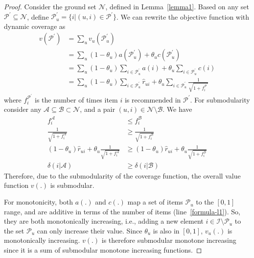 \begin{proof}Consider the ground set $\mathcal{N}$,  defined in Lemma~\ref{lemma1}. Based on any set $\mathcal{P}^{'} \subseteq \mathcal{N}$, define $\mathcal{P}^{'}_{u} = \{ i | (u,i) \in \mathcal{P}^{'}\}$. We can rewrite the objective function with dynamic coverage as 
\begin{align} 
v(\mathcal{P}^{'}) &= \sum_u v_u(\mathcal{P}^{'}_{u})\nonumber \\  
&=  \sum_u  (1-\theta_u) a(\mathcal{P}^{'}_{u})  + \theta_{u} c(\mathcal{P}^{'}_{u}) \nonumber \\
&= \sum_u  (1-\theta_u) \sum_{i \in \mathcal{P}^{'}_{u}} a(i)  + \theta_{u} \sum_{i \in\mathcal{P}^{'}_{u}} c(i) \label{formula-l1} \\
&= \sum_u  (1-\theta_u) \sum_{i \in \mathcal{P}^{'}_{u}} \hat{r}_{ui}  + \theta_{u} \sum_{i \in \mathcal{P}^{'}_{u}} \frac{1}{\sqrt{1+f_i^{\mathcal{P}^{'}}}}
\end{align}
where $f_{i}^{\mathcal{P}^{'}}$ is the number of times item $i$ is recommended  in $\mathcal{P}^{'}$. For submodularity consider any $\mathcal{A} \subseteq \mathcal{B} \subset \mathcal{N}$, and a pair $(u,i) \in \mathcal{N} \setminus \mathcal{B}$.  We have 
\begin{align*}
f_i^{\mathcal{A}} &  \leq f^{\mathcal{B}}_i \\
\frac{1}{\sqrt{1+f_i^{\mathcal{A}}}} & \geq \frac{1}{\sqrt{1+f^{\mathcal{B}}_i}} \\
(1-\theta_u) \hat{r}_{ui} + \theta_u \frac{1}{\sqrt{1+f_i^{\mathcal{A}}}} & \geq (1-\theta_u) \hat{r}_{ui} + \theta_u \frac{1}{\sqrt{1+f^{\mathcal{B}}_i}} \\
\delta(i|\mathcal{A}) & \geq \delta(i|\mathcal{B})
\end{align*}
Therefore, due to the submodularity of the coverage function, the overall value function  $v(.)$ is submodular. %
  
For monotonicity, both $a(.)$ and $c(.)$ map a set of items $\mathcal{P}_u$ to the $[0,1]$ range, and  are additive in terms of the number of items (line~\ref{formula-l1}). So, they are both monotonically increasing, i.e., adding a new element $i \in \mathcal{I} \setminus \mathcal{P}_u$ to the set $\mathcal{P}_{u}$ can only increase their value. Since  $\theta_{u} $ is also  in $[0,1]$, $v_{u}(.)$ is monotonically increasing. $v(.)$ is therefore submodular monotone increasing since it is a sum of submodular monotone increasing functions.\end{proof}


